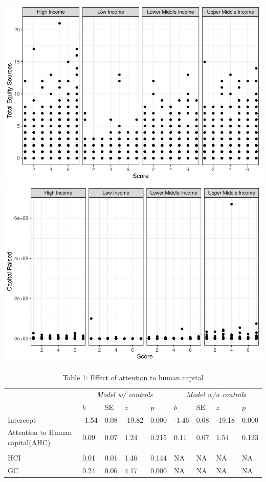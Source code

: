 \documentclass[
  english,
  man]{apa6}
\begin{document}
\includegraphics{Manuscript_files/figure-latex/unnamed-chunk-12-1.pdf} \includegraphics{Manuscript_files/figure-latex/unnamed-chunk-12-2.pdf}

\begin{table}

\caption{\label{tab:unnamed-chunk-18}Table 1: Effect of attention to human capital}
\centering
\begin{tabular}[t]{lllllllll}
\toprule
\multicolumn{1}{c}{\em{ }} & \multicolumn{4}{c}{\em{Model w/ controls}} & \multicolumn{4}{c}{\em{Model w/o controls}} \\
\cmidrule(l{3pt}r{3pt}){2-5} \cmidrule(l{3pt}r{3pt}){6-9}
  & $b$ & SE & $z$ & $p$ & $b$ & SE & $z$ & $p$\\
\midrule
Intercept & -1.54 & 0.08 & -19.82 & 0.000 & -1.46 & 0.08 & -19.18 & 0.000\\
Attention to Human capital(AHC) & 0.09 & 0.07 & 1.24 & 0.215 & 0.11 & 0.07 & 1.54 & 0.123\\
\addlinespace[2em]
\multicolumn{9}{l}{\textbf{Control variables}}\\
\hspace{1em}HCI & 0.01 & 0.01 & 1.46 & 0.144 & NA & NA & NA & NA\\
\hspace{1em}GC & 0.24 & 0.06 & 4.17 & 0.000 & NA & NA & NA & NA\\
\bottomrule
\end{tabular}
\end{table}
\end{document}
